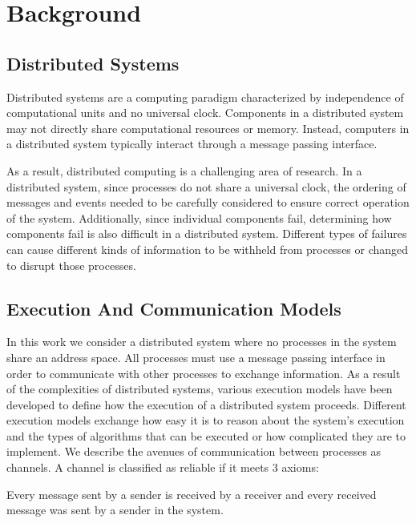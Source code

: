\chapter{Background}

\section{Distributed Systems}

Distributed systems are a computing paradigm characterized by independence of computational units and no universal clock.
Components in a distributed system may not directly share computational resources or memory.
Instead, computers in a distributed system typically interact through a message passing interface.

As a result, distributed computing is a challenging area of research.
In a distributed system, since processes do not share a universal clock, the ordering of messages and events needed to be carefully considered to ensure correct operation of the system.
Additionally, since individual components fail, determining how components fail is also difficult in a distributed system.
Different types of failures can cause different kinds of information to be withheld from processes or changed to disrupt those processes.

\section{Execution And Communication Models}

In this work we consider a distributed system where no processes in the system share an address space.
All processes must use a message passing interface in order to communicate with other processes to exchange information.
As a result of the complexities of distributed systems, various execution models have been developed to define how the execution of a distributed system proceeds.
Different execution models exchange how easy it is to reason about the system's execution and the types of algorithms that can be executed or how complicated they are to implement.
We describe the avenues of communication between processes as channels.
A channel is classified as reliable if it meets 3 axioms:

\begin{axm}
    \label{axm:reliable-channel-sender}
    Every message sent by a sender is received by a receiver and every received message was sent by a sender in the system. \cite{DISTRIBUTED}
\end{axm}

